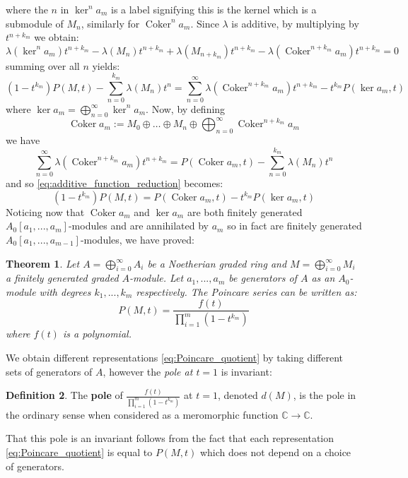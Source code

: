 \documentclass[12pt]{article}
\theoremstyle{plain}
\newtheorem{thm}{Theorem}[subsection] %
\theoremstyle{definition}
\newtheorem{defn}[thm]{Definition} %
\newcommand{\bb}[1]{\mathbb{#1}}
\newcommand{\lto}{\longrightarrow}
\begin{document}
	where the $n$ in $\ker^n a_m$ is a label signifying this is the kernel which is a submodule of $M_n$, similarly for $\operatorname{Coker}^n a_m$. Since $\lambda$ is additive, by multiplying by $t^{n+k_m}$ we obtain:
	\[\lambda (\ker^n a_m)t^{n+k_m} - \lambda (M_n)t^{n+k_m} + \lambda (M_{n+k_m})t^{n+k_m} - \lambda (\operatorname{Coker}^{n + k_m} a_{m})t^{n + k_m} = 0\]
	summing over all $n$ yields:
	\begin{equation}
		\label{eq:additive_function_reduction}
		(1 - t^{k_m})P(M,t) - \sum_{n = 0}^{k_m}\lambda(M_n)t^n = \sum_{n = 0}^\infty\lambda (\operatorname{Coker}^{n + k_m} a_{m})t^{n + k_m} - t^{k_m}P(\ker a_m, t)
	\end{equation}
	where $\ker a_m = \bigoplus_{n = 0}^\infty \ker^n a_m$. Now, by defining
	\[\operatorname{Coker }a_m := M_0 \oplus \hdots \oplus M_n \oplus \bigoplus_{n = 0}^\infty \operatorname{Coker}^{n+k_m}a_m\]
	we have
	\[
	\label{eq:clever_graded_module} \sum_{n = 0}^\infty\lambda (\operatorname{Coker}^{n + k_m} a_{m})t^{n + k_m} = P(\operatorname{Coker}a_m,t) - \sum_{n = 0}^{k_m}\lambda(M_n)t^n
	\]
	and so \eqref{eq:additive_function_reduction} becomes:
	\begin{equation}
		\label{eq:generation_reduction} (1 - t^{k_m})P(M,t) = P(\operatorname{Coker}a_m,t) - t^{k_m}P(\ker a_m, t)
	\end{equation}
	Noticing now that $\operatorname{Coker}a_m$ and $\ker a_m$ are both finitely generated $A_0[a_1,...,a_m]$-modules and are annihilated by $a_m$ so in fact are finitely generated $A_0[a_1,...,a_{m-1}]$-modules, we have proved:
	\begin{thm}
		\label{thm:Hilbert_Serre}
		Let $A = \bigoplus_{i = 0}^\infty A_i$ be a Noetherian graded ring and $M = \bigoplus_{i = 0}^\infty M_i$ a finitely generated graded $A$-module. Let $a_1,...,a_m$ be generators of $A$ as an $A_0$-module with degrees $k_1,...,k_m$ respectively. The Poincare series can be written as:
		\begin{equation}
			\label{eq:Poincare_quotient}
			P(M,t) = \frac{f(t)}{\prod_{i = 1}^m(1 - t^{k_m})}
		\end{equation}
		where $f(t)$ is a polynomial.
	\end{thm}
	We obtain different representations \eqref{eq:Poincare_quotient} by taking different sets of generators of $A$, however the \emph{pole at $t = 1$} is invariant:
	\begin{defn}
		The \textbf{pole} of $\frac{f(t)}{\prod_{i = 1}^m(1 - t^{k_m})}$ at $t = 1$, denoted $d(M)$, is the pole in the ordinary sense when considered as a meromorphic function $\bb{C} \lto \bb{C}$.
	\end{defn}
	That this pole is an invariant follows from the fact that each representation \eqref{eq:Poincare_quotient} is equal to $P(M,t)$ which does not depend on a choice of generators.
	
\end{document}
